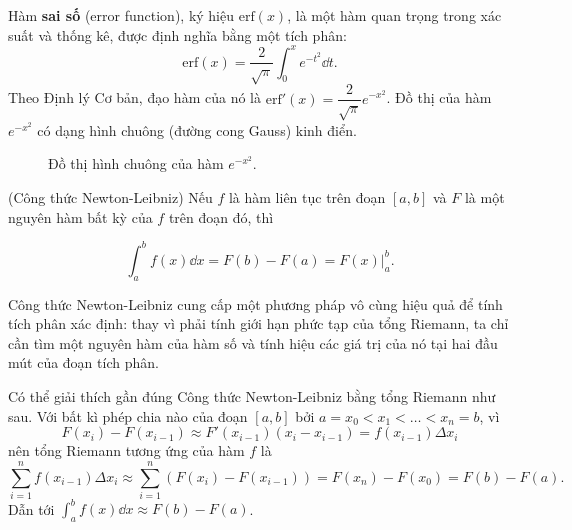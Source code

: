 \begin{example}
    Hàm \textbf{sai số} (error function), ký hiệu $\mathrm{erf}(x)$, là một hàm quan trọng trong xác suất và thống kê, được định nghĩa bằng một tích phân:
    \[ \mathrm{erf}(x) = \dfrac{2}{\sqrt{\pi}} \int_{0}^{x} e^{-t^2} \dd t. \]
    Theo Định lý Cơ bản, đạo hàm của nó là $\mathrm{erf}'(x) = \dfrac{2}{\sqrt{\pi}} e^{-x^2}$. Đồ thị của hàm $e^{-x^2}$ có dạng hình chuông (đường cong Gauss) kinh điển.
    
    \begin{figure}[H]
        \centering
        \caption{Đồ thị hình chuông của hàm $e^{-x^2}$.}
    \end{figure}
\end{example}


\begin{theorem} (Công thức Newton-Leibniz)
    Nếu $f$ là hàm liên tục trên đoạn $[a, b]$ và $F$ là một nguyên hàm bất kỳ của $f$ trên đoạn đó, thì
    \begin{importantbox}
    \[ \int_{a}^{b} f(x) \dd x = F(b) - F(a) = \left.F(x)\right|_a^b. \]
    \end{importantbox}
\end{theorem}

Công thức Newton-Leibniz cung cấp một phương pháp vô cùng hiệu quả để tính tích phân xác định: thay vì phải tính giới hạn phức tạp của tổng Riemann, ta chỉ cần tìm một nguyên hàm của hàm số và tính hiệu các giá trị của nó tại hai đầu mút của đoạn tích phân.

Có thể giải thích gần đúng Công thức Newton-Leibniz bằng tổng Riemann như sau. Với bất kì phép chia nào của đoạn $[a, b]$ bởi $a = x_0 < x_1 < \dots < x_n = b$, vì
\[ F(x_i) - F(x_{i-1}) \approx F'(x_{i-1})(x_i - x_{i-1}) = f(x_{i-1})\Delta x_i \]
nên tổng Riemann tương ứng của hàm $f$ là
\[ \sum_{i=1}^{n} f(x_{i-1})\Delta x_i \approx \sum_{i=1}^{n} (F(x_i) - F(x_{i-1})) = F(x_n) - F(x_0) = F(b) - F(a). \]
Dẫn tới $\int_a^b f(x) \dd x \approx F(b) - F(a)$.

